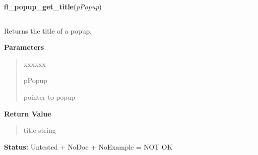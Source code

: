     \vspace{0.5ex}

\hspace{.8\funcindent}\begin{boxedminipage}{\funcwidth}

    \raggedright \textbf{fl\_popup\_get\_title}(\textit{pPopup})

    \vspace{-1.5ex}

    \rule{\textwidth}{0.5\fboxrule}
\setlength{\parskip}{2ex}
    Returns the title of a popup.

\setlength{\parskip}{1ex}
      \textbf{Parameters}
      \vspace{-1ex}

      \begin{quote}
        \begin{Ventry}{xxxxxx}

          \item[pPopup]

          pointer to popup

        \end{Ventry}

      \end{quote}

      \textbf{Return Value}
    \vspace{-1ex}

      \begin{quote}
      title string

      \end{quote}

\textbf{Status:} Untested + NoDoc + NoExample = NOT OK



    \end{boxedminipage}

    \label{xformslib:library:fl_popup_set_title}

    \vspace{0.5ex}

